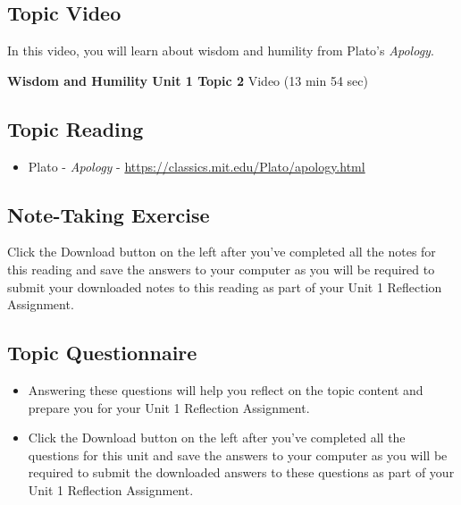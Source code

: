 \documentclass[
]{book}
\providecommand{\tightlist}{%
  \setlength{\itemsep}{0pt}\setlength{\parskip}{0pt}}
\begin{document}
\hypertarget{topic-video-1}{%
\subsection*{Topic Video}\label{topic-video-1}}

In this video, you will learn about wisdom and humility from Plato's \emph{Apology}.

\textbf{Wisdom and Humility Unit 1 Topic 2} Video (13 min 54 sec)

\hypertarget{topic-reading-1}{%
\subsection*{Topic Reading}\label{topic-reading-1}}

\begin{itemize}
\tightlist
\item
  Plato - \emph{Apology} - \url{https://classics.mit.edu/Plato/apology.html}
\end{itemize}

\hypertarget{note-taking-exercise-1}{%
\subsection*{Note-Taking Exercise}\label{note-taking-exercise-1}}

\begin{reflect}
Click the Download button on the left after you've completed all the notes for this reading and save the answers to your computer as you will be required to submit your downloaded notes to this reading as part of your Unit 1 Reflection Assignment.
\end{reflect}

\hypertarget{topic-questionnaire-1}{%
\subsection*{Topic Questionnaire}\label{topic-questionnaire-1}}

\begin{reflect}
\begin{itemize}
\tightlist
\item
  Answering these questions will help you reflect on the topic content and prepare you for your Unit 1 Reflection Assignment.
\item
  Click the Download button on the left after you've completed all the questions for this unit and save the answers to your computer as you will be required to submit the downloaded answers to these questions as part of your Unit 1 Reflection Assignment.
\end{itemize}
\end{reflect}
\end{document}
